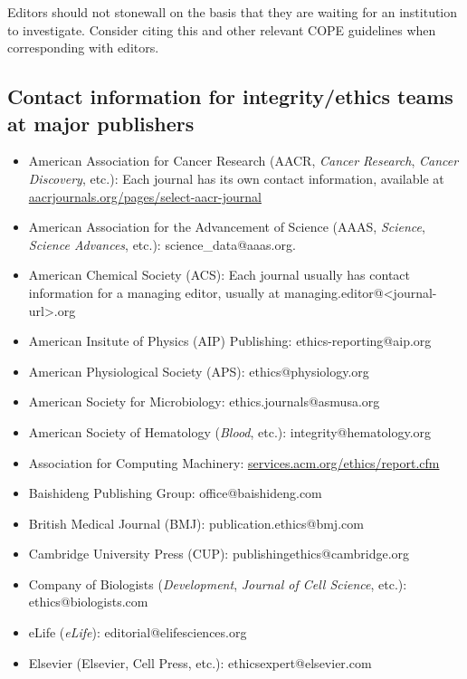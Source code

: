 \documentclass[letterpaper, 12pt]{article}
\begin{document}
Editors should not stonewall on the basis that they are waiting for an institution to investigate. Consider citing this and other relevant COPE guidelines when corresponding with editors.

\subsection*{Contact information for integrity/ethics teams at major publishers}

\begin{itemize}
    \setlength\itemsep{-0.5em}
    \item American Association for Cancer Research (AACR, \textit{Cancer Research}, \textit{Cancer Discovery}, etc.): Each journal has its own contact information, available at \href{https://aacrjournals.org/pages/select-aacr-journal}{aacrjournals.org/pages/select-aacr-journal} 
    \item American Association for the Advancement of Science (AAAS, \textit{Science}, \textit{Science Advances}, etc.):  science\_data@aaas.org.
    \item American Chemical Society (ACS): Each journal usually has contact information for a managing editor, usually at managing.editor@<journal-url>.org
    \item American Insitute of Physics (AIP) Publishing: ethics-reporting@aip.org
    \item American Physiological Society (APS): ethics@physiology.org
    \item American Society for Microbiology: ethics.journals@asmusa.org
    \item American Society of Hematology (\textit{Blood}, etc.): integrity@hematology.org
    \item Association for Computing Machinery: \href{https://services.acm.org/ethics/report.cfm}{services.acm.org/ethics/report.cfm}
    \item Baishideng Publishing Group: office@baishideng.com
    \item British Medical Journal (BMJ): publication.ethics@bmj.com
    \item Cambridge University Press (CUP): publishingethics@cambridge.org
    \item Company of Biologists (\textit{Development}, \textit{Journal of Cell Science}, etc.): ethics@biologists.com
    \item eLife (\textit{eLife}): editorial@elifesciences.org
    \item Elsevier (Elsevier, Cell Press, etc.): ethicsexpert@elsevier.com

\end{itemize}
\end{document}
